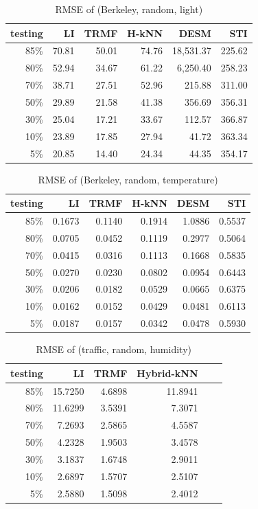 \begin{table} [htbp]
\centering
\caption{RMSE of (Berkeley, random, light)}
\label{table:berkeley_random_light}
\begin{tabular}{ r | r r r r r}
	testing	&LI	&TRMF	&H-kNN	&DESM	&STI\\ \hline
	85\%	&70.81	&50.01	&74.76	&18,531.37	&225.62\\
	80\%	&52.94	&34.67	&61.22	&6,250.40	&258.23\\
	70\%	&38.71	&27.51	&52.96	&215.88	&311.00\\
	50\%	&29.89	&21.58	&41.38	&356.69	&356.31\\
	30\%	&25.04	&17.21	&33.67	&112.57	&366.87\\
	10\%	&23.89	&17.85	&27.94	&41.72	&363.34\\
	 5\%	&20.85	&14.40	&24.34	&44.35	&354.17
\end{tabular}
\end{table}

\begin{table}[htbp]
\centering
\caption{RMSE of (Berkeley, random, temperature)}
\label{table:berkeley_random_tem}
\begin{tabular}{ r | r r r r r}
	testing	&LI	&TRMF	&H-kNN	&DESM	&STI\\ \hline
	85\%	&0.1673	&0.1140	&0.1914	&1.0886	&0.5537\\
	80\%	&0.0705	&0.0452	&0.1119	&0.2977	&0.5064\\
	70\%	&0.0415	&0.0316	&0.1113	&0.1668	&0.5835\\
	50\%	&0.0270	&0.0230	&0.0802	&0.0954	&0.6443\\
	30\%	&0.0206	&0.0182	&0.0529	&0.0665	&0.6375\\
	10\%	&0.0162	&0.0152	&0.0429	&0.0481	&0.6113\\
	 5\%	&0.0187	&0.0157	&0.0342	&0.0478	&0.5930
\end{tabular}
\end{table}

\begin{table} [htbp]
\centering
\caption{RMSE of (traffic, random, humidity)}
\label{table:traffic_random_hum}
\begin{tabular}{ r | r r r r r}
	testing	&LI	&TRMF	&Hybrid-kNN \\ \hline
	85\%	&15.7250	&4.6898	&11.8941\\ 
	80\%	&11.6299	&3.5391	&7.3071\\
	70\%	& 7.2693	&2.5865	&4.5587\\
	50\%	& 4.2328	&1.9503	&3.4578\\
	30\%	& 3.1837	&1.6748	&2.9011\\
	10\%	& 2.6897	&1.5707	&2.5107\\
	 5\%	& 2.5880	&1.5098	&2.4012
\end{tabular}
\end{table}

